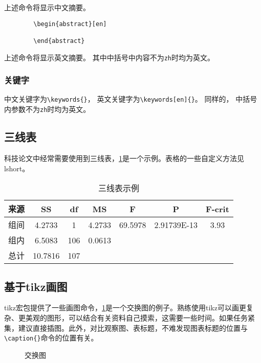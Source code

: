 \documentclass{hainanuthesis}
\theoremstyle{definition}
\begin{document}
	上述命令将显示中文摘要。
	
	\begin{verbatim}
		\begin{abstract}[en]
			
		\end{abstract}
	\end{verbatim}
	
	上述命令将显示英文摘要。
	其中中括号中内容不为\verb|zh|时均为英文。
	
	\subsubsection{关键字}
	
	中文关键字为\verb|\keywords{}|，
	英文关键字为\verb|\keywords[en]{}|。
	同样的，
	中括号内参数不为\verb|zh|时均为英文。
	
	\subsection{三线表}
	
	科技论文中经常需要使用到三线表，\cref{tb:03}是一个示例。表格的一些自定义方法见lshort。
	\begin{table}[H]
		\caption{三线表示例}
		\centering
		\label{tb:03}
		\setlength{\tabcolsep}{3pt}
		\begin{tabular}{ccccccc}
			\toprule[1.5pt]
			来源 & SS & df & MS & F & P & F-crit \\
			\midrule[1pt]
			组间 & 4.2733 & 1 & 4.2733 & 69.5978 & 2.91739E-13 & 3.93\\
			组内 & 6.5083 & 106 & 0.0613 & & &\\
			总计 & 10.7816 & 107 &  & & & \\
			\bottomrule[1.5pt]
		\end{tabular}
	\end{table}
    
    \subsection{基于tikz画图}
	tikz宏包提供了一些画图命令，\cref{pt:01}是一个交换图的例子。熟练使用tikz可以画更复杂、更美观的图形，可以结合有关资料自己摸索，这需要一些时间。如果任务紧集，建议直接插图。此外，对比观察图、表标题，不难发现图表标题的位置与\verb|\caption{}|命令的位置有关。
	\begin{figure}[H]
		\centering
		\caption{交换图}
		\label{pt:01}
	\end{figure}
	
\end{document}

